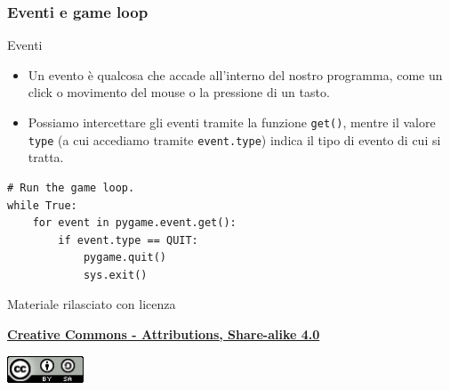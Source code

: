 \documentclass{beamer}
\begin{document}
\begin{frame}[fragile]
\frametitle{Eventi e game loop}
\begin{block}{Eventi}
	\begin{itemize}
		\item Un evento è qualcosa che accade all'interno del nostro programma, come un click o movimento del mouse o la pressione di un tasto.
		\item Possiamo intercettare gli eventi tramite la funzione \texttt{get()}, mentre il valore \texttt{type} (a cui accediamo tramite \texttt{event.type}) indica il tipo di evento di cui si tratta.
	\end{itemize}
\end{block}
\begin{lstlisting}
# Run the game loop.
while True:
    for event in pygame.event.get():
        if event.type == QUIT:
            pygame.quit()
            sys.exit()
\end{lstlisting}
\end{frame}

\begin{frame}

\begin{center}
	\bigskip
	Materiale rilasciato con licenza
	
	\textbf{\href{http://creativecommons.org/licenses/by-sa/4.0/}{Creative Commons - Attributions, Share-alike 4.0}}
	
	\medskip
	\includegraphics[height=0.8cm]{images/cc.jpeg}
\end{center}

\end{frame}	
\end{document}
